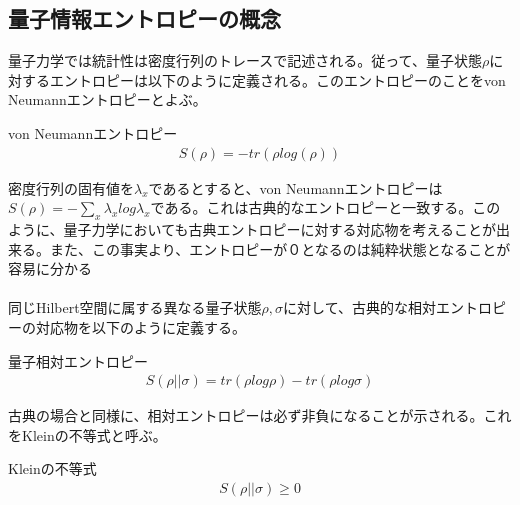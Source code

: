 \documentclass[a4paper,10.5pt]{article}
\numberwithin{equation}{section}
\begin{document}
\subsection{量子情報エントロピーの概念}
量子力学では統計性は密度行列のトレースで記述される。従って、量子状態$\rho$に対するエントロピーは以下のように定義される。このエントロピーのことをvon Neumannエントロピーとよぶ。
\begin{defbox}{von Neumannエントロピー}
\begin{equation}\begin{split}
    S(\rho)=-tr(\rho log(\rho))
\end{split} \end{equation}
\end{defbox}
密度行列の固有値を$\lambda_{x}$であるとすると、von Neumannエントロピーは$S(\rho)=-\sum_{x}\lambda_{x}log\lambda_{x}$である。これは古典的なエントロピーと一致する。このように、量子力学においても古典エントロピーに対する対応物を考えることが出来る。また、この事実より、エントロピーが０となるのは純粋状態となることが容易に分かる\\
\\
同じHilbert空間に属する異なる量子状態$\rho,\sigma$に対して、古典的な相対エントロピーの対応物を以下のように定義する。
\begin{defbox}{量子相対エントロピー}
\begin{equation}\begin{split}
    S(\rho||\sigma) = tr(\rho log\rho) -tr(\rho log\sigma)
\end{split} \end{equation}
\end{defbox}
古典の場合と同様に、相対エントロピーは必ず非負になることが示される。これをKleinの不等式と呼ぶ。
\begin{resultbox}{Kleinの不等式}
\begin{equation}\begin{split}
    S(\rho||\sigma)\geq 0
\end{split} \end{equation}
\end{resultbox}
\end{document}
